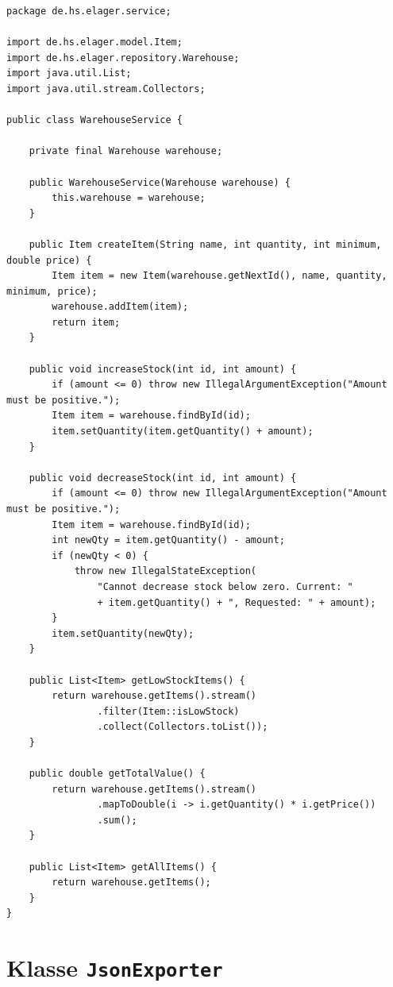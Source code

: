 \documentclass[12pt, a4paper, twoside]{report}
\begin{document}
\begin{lstlisting}[caption={WarehouseService.java -- Geschäftslogik}, label={lst:service}]
package de.hs.elager.service;

import de.hs.elager.model.Item;
import de.hs.elager.repository.Warehouse;
import java.util.List;
import java.util.stream.Collectors;

public class WarehouseService {

    private final Warehouse warehouse;

    public WarehouseService(Warehouse warehouse) {
        this.warehouse = warehouse;
    }

    public Item createItem(String name, int quantity, int minimum, double price) {
        Item item = new Item(warehouse.getNextId(), name, quantity, minimum, price);
        warehouse.addItem(item);
        return item;
    }

    public void increaseStock(int id, int amount) {
        if (amount <= 0) throw new IllegalArgumentException("Amount must be positive.");
        Item item = warehouse.findById(id);
        item.setQuantity(item.getQuantity() + amount);
    }

    public void decreaseStock(int id, int amount) {
        if (amount <= 0) throw new IllegalArgumentException("Amount must be positive.");
        Item item = warehouse.findById(id);
        int newQty = item.getQuantity() - amount;
        if (newQty < 0) {
            throw new IllegalStateException(
                "Cannot decrease stock below zero. Current: "
                + item.getQuantity() + ", Requested: " + amount);
        }
        item.setQuantity(newQty);
    }

    public List<Item> getLowStockItems() {
        return warehouse.getItems().stream()
                .filter(Item::isLowStock)
                .collect(Collectors.toList());
    }

    public double getTotalValue() {
        return warehouse.getItems().stream()
                .mapToDouble(i -> i.getQuantity() * i.getPrice())
                .sum();
    }

    public List<Item> getAllItems() {
        return warehouse.getItems();
    }
}
\end{lstlisting}

\section{Klasse \texttt{JsonExporter}}
\end{document}

